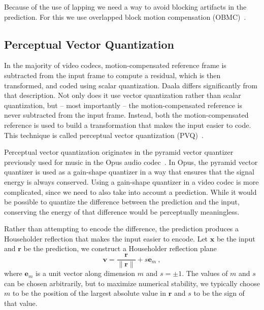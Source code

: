 \documentclass[english,conference,10pt]{IEEEtran}
\begin{document}
Because of the use of lapping we need a way to avoid blocking artifacts
in the prediction. For this we use overlapped block motion compensation
(OBMC)~\cite{OBMC}.


\subsection{Perceptual Vector Quantization}

In the majority of video codecs, motion-compensated reference frame
is subtracted from the input frame to compute a residual, which is
then transformed, and coded using scalar quantization. Daala differs
significantly from that description. Not only does it use vector quantization
rather than scalar quantization, but -- most importantly -- the motion-compensated
reference is never subtracted from the input frame. Instead, both
the motion-compensated reference is used to build a transformation
that makes the input easier to code. This technique is called perceptual
vector quantization (PVQ)~\cite{valin2015spie}.

Perceptual vector quantization originates in the pyramid vector quantizer
previously used for music in the Opus audio codec~\cite{ValinAES}. In Opus,
the pyramid vector quantizer is used as a gain-shape quantizer in a way that
ensures that the signal energy is always conserved. Using a gain-shape
quantizer in a video codec is more complicated, since we need to also take
into account a prediction. While it would be possible to quantize the difference
between the prediction and the input, conserving the energy of that
difference would be perceptually meaningless.

Rather than attempting to encode the difference, the prediction produces
a Householder reflection that makes the input easier to encode. Let 
$\mathbf{x}$ be the input and $\mathbf{r}$ be the prediction, we construct
 a Householder reflection plane
\begin{equation}
\mathbf{v} = \frac{\mathbf{r}}{\|\mathbf{r}\|} + s\mathbf{e}_m\ ,
\end{equation}
where $\mathbf{e}_m$ is a unit vector along dimension $m$ and $s = \pm1$.
The values of $m$ and $s$ can be chosen arbitrarily, but to maximize
numerical stability, we typically choose $m$ to be the position of the
largest absolute value in $\mathbf{r}$ and $s$ to be the sign of that value.
\end{document}
